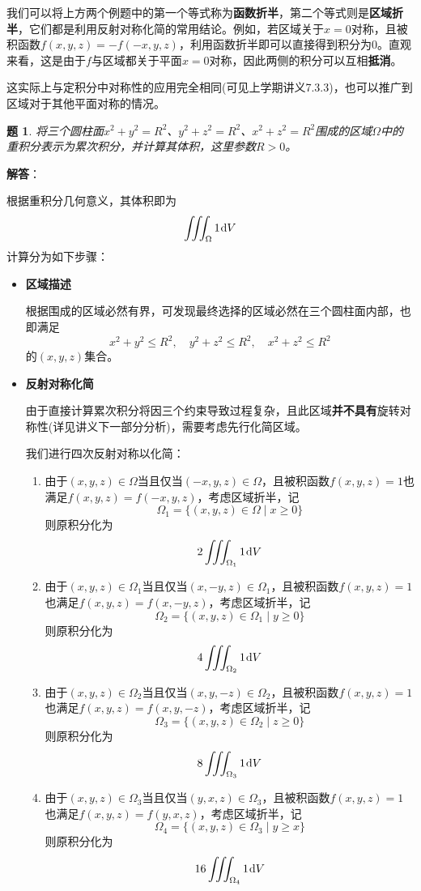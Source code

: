 \documentclass[a4paper,UTF8,fontset=windows,AutoFakeBold]{ctexart}
\newcommand*{\dr}{\hspace{0.07em}\mathrm{d}}
\newcommand*{\note}{\noindent *}
\theoremstyle{ex}
\newtheorem{exercise}{题}
\newcommand{\sol}[1]{{\vspace{5pt}\kaishu\noindent\textbf{解答}：\vspace{-3pt}
\begin{compactitem}
    \item[] #1
\end{compactitem}
}}
\begin{document}
我们可以将上方两个例题中的第一个等式称为\textbf{函数折半}，第二个等式则是\textbf{区域折半}，它们都是利用反射对称化简的常用结论。例如，若区域关于$x=0$对称，且被积函数$f(x,y,z)=-f(-x,y,z)$，利用函数折半即可以直接得到积分为0。直观来看，这是由于$f$与区域都关于平面$x=0$对称，因此两侧的积分可以互相\textbf{抵消}。

\note 这实际上与定积分中对称性的应用完全相同(可见上学期讲义7.3.3)，也可以推广到区域对于其他平面对称的情况。

\begin{framed}
\begin{exercise}\label{three column v}
    将三个圆柱面$x^2+y^2=R^2$、$y^2+z^2=R^2$、$x^2+z^2=R^2$围成的区域$\Omega$中的重积分表示为累次积分，并计算其体积，这里参数$R>0$。
\end{exercise}
\sol{
    根据重积分几何意义，其体积即为
    $$\iiint_\Omega1\dr V$$
    计算分为如下步骤：
    \begin{itemize}
        \item \textbf{区域描述}
        
        根据围成的区域必然有界，可发现最终选择的区域必然在三个圆柱面内部，也即满足
        $$x^2+y^2\le R^2,\quad y^2+z^2\le R^2,\quad x^2+z^2\le R^2$$
        的$(x,y,z)$集合。

        \item \textbf{反射对称化简}
        
        由于直接计算累次积分将因三个约束导致过程复杂，且此区域\textbf{并不具有}旋转对称性(详见讲义下一部分分析)，需要考虑先行化简区域。

        我们进行四次反射对称以化简：
        \begin{enumerate}
            \item 由于$(x,y,z)\in\Omega$当且仅当$(-x,y,z)\in\Omega$，且被积函数$f(x,y,z)=1$也满足$f(x,y,z)=f(-x,y,z)$，考虑区域折半，记
            $$\Omega_1=\{(x,y,z)\in\Omega\mid x\ge0\}$$
            则原积分化为
            $$2\iiint_{\Omega_1}1\dr V$$
            \item 由于$(x,y,z)\in\Omega_1$当且仅当$(x,-y,z)\in\Omega_1$，且被积函数$f(x,y,z)=1$也满足$f(x,y,z)=f(x,-y,z)$，考虑区域折半，记
            $$\Omega_2=\{(x,y,z)\in\Omega_1\mid y\ge0\}$$
            则原积分化为
            $$4\iiint_{\Omega_2}1\dr V$$
            \item 由于$(x,y,z)\in\Omega_2$当且仅当$(x,y,-z)\in\Omega_2$，且被积函数$f(x,y,z)=1$也满足$f(x,y,z)=f(x,y,-z)$，考虑区域折半，记
            $$\Omega_3=\{(x,y,z)\in\Omega_2\mid z\ge0\}$$
            则原积分化为
            $$8\iiint_{\Omega_3}1\dr V$$
            \item 由于$(x,y,z)\in\Omega_3$当且仅当$(y,x,z)\in\Omega_3$，且被积函数$f(x,y,z)=1$也满足$f(x,y,z)=f(y,x,z)$，考虑区域折半，记
            $$\Omega_4=\{(x,y,z)\in\Omega_3\mid y\ge x\}$$
            则原积分化为
            $$16\iiint_{\Omega_4}1\dr V$$
        \end{enumerate}


\end{itemize}}
\end{framed}
\end{document}
